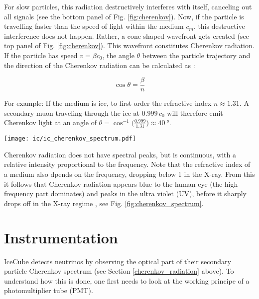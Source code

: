 For slow particles, this radiation destructively interferes with itself, canceling out all signals (see the bottom panel of Fig. \ref{fig:cherenkov}). Now, if the particle is travelling faster than the speed of light within the medium $c_m$, this destructive interference does not happen. Rather, a cone-shaped wavefront gets created (see top panel of Fig. \ref{fig:cherenkov}). This wavefront constitutes Cherenkov radiation. If the particle has speed $v=\beta c_0$, the angle $\theta$ between the particle trajectory and the direction of the Cherenkov radiation can be calculated as :

\begin{equation}
\cos{\theta} = \frac{\beta}{n}
\end{equation}

For example: If the medium is ice, to first order the refractive index $n\approx1.31$. A secondary muon traveling through the ice at $0.999\,c_0$ will therefore emit Cherenkov light at an angle of $\theta = \cos^{-1}{\big(\frac{0.999}{1.31}\big)} \approx \SI{40}{\degree}$. 
\begin{marginfigure}
    \texttt{[image: ic/ic\_cherenkov\_spectrum.pdf]}
    \caption[Cherenkov spectrum]{Cherenkov spectrum for a particle with $v=0.8 \,c_0$ in water. The intensity peaks at $\SI{4e15}{\Hz}$, corresponding to a wavelength of \SI{75}{\nm}, lying at the high-frequency end of the UV spectrum. Adapted from \cite{Fulop1992}.}
\end{marginfigure}
Cherenkov radiation does not have spectral peaks, but is continuous, with a relative intensity proportional to the frequency. Note that the refractive index of a medium also dpends on the frequency, dropping below 1 in the X-ray. From this it follows that Cherenkov radiation appears blue to the human eye (the high-frequency part dominates) and peaks in the ultra violet (UV), before it sharply drops off in the X-ray regime , see Fig. \ref{fig:cherenkov_spectrum}.

\section{Instrumentation}

IceCube detects neutrinos by observing the optical part of their secondary particle Cherenkov spectrum (see Section \ref{cherenkov_radiation} above). To understand how this is done, one first needs to look at the working principe of a photomultiplier tube (PMT).

